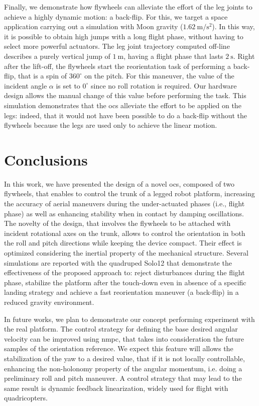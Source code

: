 \documentclass[letterpaper, 10 pt, conference]{ieeeconf}      %
\begin{document}
Finally, we demonstrate how flywheels can alleviate the effort of the leg joints to achieve a highly dynamic motion: a back-flip. 
For this, we target a space application carrying out a simulation with Moon gravity ($1.62 \ \mathrm{m/s^2}$).
In this way, it is possible to obtain high jumps with a long flight phase, without having to select more powerful actuators.  
The leg joint trajectory computed off-line describes a purely vertical jump of $1 \ \mathrm{m}$, having a flight phase that lasts $2 \ \mathrm{s}$.
Right after the lift-off, the flywheels start the reorientation task of performing a back-flip, that is a spin of $360^\circ$ on the pitch.
For this maneuver, the value of the incident angle $\alpha$ is set to $0^\circ$ since no roll rotation is required.
Our hardware design allows the manual change of this value before performing the task.
This simulation demonstrates that the \gls{ocs} alleviate the effort to be applied on the legs: indeed, that it would not have been possible to do a back-flip without the flywheels because the legs are used only to achieve the linear motion.


\section{Conclusions}
\label{sec:conclusions}

In this work, we have presented the design of a novel \gls{ocs}, composed of two flywheels, that enables to control the trunk of a legged robot platform, 
increasing the accuracy of aerial maneuvers during the under-actuated phases (i.e., flight phase) as well as 
enhancing stability when in contact by damping oscillations.
The novelty of the design, that involves the flywheels to be attached with incident rotational axes on the trunk, allows to control the orientation
in both the roll and pitch directions while keeping the device compact. Their effect is optimized considering the inertial property of the mechanical structure. 
Several simulations are reported with the quadruped Solo12 that demonstrate the effectiveness of the proposed approach to: 
reject disturbances during the flight phase, stabilize the platform after the touch-down even in absence of a specific landing strategy and 
achieve a fast reorientation maneuver (a back-flip) in a reduced gravity environment. 

In future works, we plan to demonstrate our concept performing experiment with the real platform. The control strategy for defining the base desired angular velocity can be improved using \gls{nmpc}, that takes into consideration the future samples of the orientation reference.
We expect this feature will allows the stabilization of the yaw to a desired value, that if it is not locally controllable, enhancing the non-holonomy property of the angular momentum, i.e. doing a preliminary roll and pitch maneuver. 
A control strategy that may lead to the same result is dynamic feedback linearization, widely used for flight with quadricopters.
\end{document}
